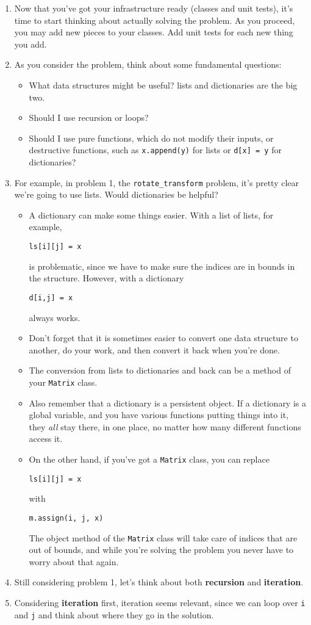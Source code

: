 \documentclass[12pt]{article}
\newcommand{\bi}{\begin{itemize}}
\newcommand{\li}{\item}
\newcommand{\ei}{\end{itemize}}
\begin{document}
\begin{enumerate}
\li Now that you've got your infrastructure ready (classes and unit tests), it's time to
start thinking about actually solving the problem.  As you proceed, you may add
new pieces to your classes.  Add unit tests for each new thing you add.

\li As you consider the problem, think about some fundamental questions:
\bi
\li What data structures might be useful?  lists and dictionaries are the big two.
\li Should I use recursion or loops?
\li Should I use pure functions, which do not modify their inputs, or
destructive functions, such as \lstinline{x.append(y)} for lists or \lstinline{d[x] = y}
for dictionaries?
\ei
\li For example, in problem 1, the \lstinline{rotate_transform} problem, it's pretty clear
we're going to use lists.  Would dictionaries be helpful?
\bi
\li A dictionary can make some
things easier.  With a list of lists, for example,
\begin{lstlisting}
ls[i][j] = x
\end{lstlisting}
 is problematic,
since we have to make sure the indices are in bounds in the structure.  However,
with a dictionary
\begin{lstlisting}
d[i,j] = x
\end{lstlisting}
 always works.
\li Don't forget that it is sometimes easier to convert one data structure to another,
do your work, and then convert it back when you're done.
\li The conversion from lists to dictionaries and back can be a method of your
\lstinline{Matrix} class.
\li Also remember that a dictionary is a persistent object.
If a dictionary is a global variable, and you have various functions
putting things into it, they {\em all} stay there, in one place, no matter how many
different functions access it.
\li On the other hand, if you've got a \lstinline{Matrix} class, you can replace
\begin{lstlisting}
ls[i][j] = x
\end{lstlisting}
with
\begin{lstlisting}
m.assign(i, j, x)
\end{lstlisting}
The object method of the \lstinline{Matrix} class
 will take care of indices that are out of bounds, and
while you're solving the problem you never have to worry about that again.
\ei
\li Still considering problem 1, let's think about both {\bf recursion} and {\bf iteration}.
\li Considering {\bf iteration} first, iteration seems relevant, since
we can loop over \lstinline{i} and \lstinline{j}
and think about where they go in the solution.
\begin{multicols}{2}

\end{multicols}
\end{enumerate}
\end{document}
